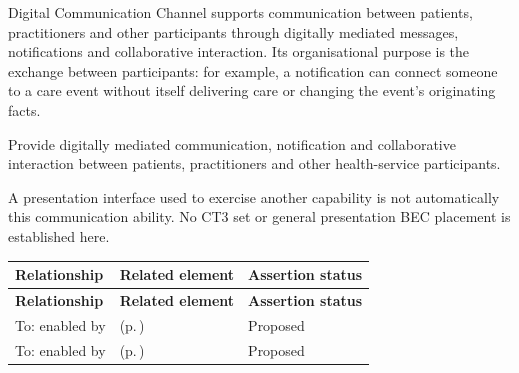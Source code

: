 Digital Communication Channel supports communication between patients, practitioners and other participants through digitally mediated messages, notifications and collaborative interaction. Its organisational purpose is the exchange between participants: for example, a notification can connect someone to a care event without itself delivering care or changing the event's originating facts.



Provide digitally mediated communication, notification and collaborative interaction between patients, practitioners and other health-service participants.



A presentation interface used to exercise another capability is not automatically this communication ability. No CT3 set or general presentation BEC placement is established here.


\begingroup\small\setlength{\TableWidth}{\dimexpr\linewidth-6\tabcolsep-4\arrayrulewidth\relax}
\begin{longtable}{|>{\raggedright\arraybackslash}p{0.27\TableWidth}|>{\raggedright\arraybackslash}p{0.48\TableWidth}|>{\raggedright\arraybackslash}p{0.25\TableWidth}|}
\hline\rowcolor{TableHead}\textbf{Relationship} & \textbf{Related element} & \textbf{Assertion status}\\\hline\endfirsthead
\hline\rowcolor{TableHead}\textbf{Relationship} & \textbf{Related element} & \textbf{Assertion status}\\\hline\endhead
\hline\endfoot
To: enabled by & \nameref{cap:bec-clinical-communication-administration} (p.\,\pageref{cap:bec-clinical-communication-administration}) & Proposed\\\hline
To: enabled by & \nameref{cap:bec-general-collaboration} (p.\,\pageref{cap:bec-general-collaboration}) & Proposed\\\hline
\end{longtable}\endgroup

